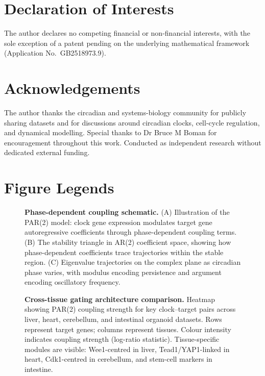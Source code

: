 \documentclass[11pt,letterpaper]{article}
\begin{document}
\section*{Declaration of Interests}

The author declares no competing financial or non-financial interests, with the sole exception of a patent pending on the underlying mathematical framework (Application No.\ GB2518973.9).

\section*{Acknowledgements}

The author thanks the circadian and systems-biology community for publicly sharing datasets and for discussions around circadian clocks, cell-cycle regulation, and dynamical modelling. Special thanks to Dr Bruce M Boman for encouragement throughout this work. Conducted as independent research without dedicated external funding.

\section{Figure Legends}

\begin{figure}[H]
\caption{\textbf{Phase-dependent coupling schematic.} (A) Illustration of the PAR(2) model: clock gene expression modulates target gene autoregressive coefficients through phase-dependent coupling terms. (B) The stability triangle in AR(2) coefficient space, showing how phase-dependent coefficients trace trajectories within the stable region. (C) Eigenvalue trajectories on the complex plane as circadian phase varies, with modulus encoding persistence and argument encoding oscillatory frequency.}
\label{fig:schematic}
\end{figure}

\begin{figure}[H]
\caption{\textbf{Cross-tissue gating architecture comparison.} Heatmap showing PAR(2) coupling strength for key clock--target pairs across liver, heart, cerebellum, and intestinal organoid datasets. Rows represent target genes; columns represent tissues. Colour intensity indicates coupling strength (log-ratio statistic). Tissue-specific modules are visible: Wee1-centred in liver, Tead1/YAP1-linked in heart, Cdk1-centred in cerebellum, and stem-cell markers in intestine.}
\label{fig:cross_tissue}
\end{figure}
\end{document}
